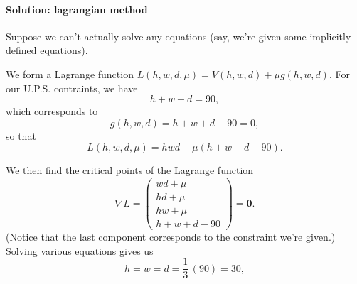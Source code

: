 \documentclass[11pt]{article}
\renewcommand{\vec}[1]{\bm{#1}}
\begin{document}
\paragraph{Solution: lagrangian method}

Suppose we can't actually solve any equations (say, we're given some implicitly defined equations).

We form a Lagrange function \(L(h, w, d, \mu) = V(h, w, d) + \mu g(h, w, d)\). For our U.P.S. contraints, we have
\[
	h+w+d = 90,
\]
which corresponds to
\[
	g(h, w, d) = h+w+d-90 = 0,
\]
so that
\[
	L(h, w, d, \mu) = hwd + \mu (h+w+d-90).
\]

We then find the critical points of the Lagrange function
\[
	\nabla L = 
	\begin{pmatrix}
		wd + \mu \\
		hd + \mu \\
		hw + \mu \\
		h+w+d-90
	\end{pmatrix}
	= \vec 0.
\]
(Notice that the last component corresponds to the constraint we're given.) Solving various equations gives us
\[
	h = w = d = \frac 1 3 \, (90) = 30,
\]
\end{document}

